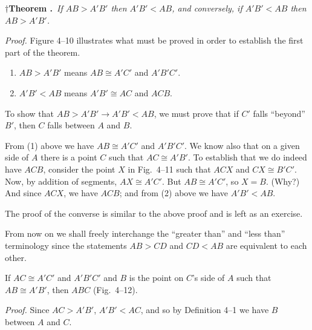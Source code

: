 \documentclass[11pt]{book}
\theoremstyle{bkplain}
\theoremstyle{XIplainnote}
\theoremstyle{bkplain}
\theoremstyle{bkplain}
\begin{document}
%
\par\medskip\noindent
\textbf{$\dagger$Theorem \thetheorem.}\ \emph{If $AB > A'B'$ then
$A'B' < AB$, and conversely, if $A'B' < AB$ then $AB > A'B'$.}%
\begingroup\let\thefootnote\relax
{}%
\endgroup
\par\medskip

\noindent\emph{Proof.} Figure 4--10 illustrates what must be proved in order to
establish the first part of the theorem.

\begin{enumerate}[label=(\arabic*), leftmargin=2.2em, itemsep=1pt, topsep=3pt]
\item $AB > A'B'$ means $AB \cong A'C'$ and $A'B'C'$.
\item $A'B' < AB$ means $A'B' \cong AC$ and $ACB$.
\end{enumerate}

\FIGIVTENELEVEN

To show that $AB > A'B' \rightarrow A'B' < AB$, we must prove that if $C'$ falls
``beyond'' $B'$, then $C$ falls between $A$ and $B$.

From (1) above we have $AB \cong A'C'$ and $A'B'C'$. We know also that on a
given side of $A$ there is a point $C$ such that $AC \cong A'B'$. To establish
that we do indeed have $ACB$, consider the point $X$ in Fig.~4--11 such that
$ACX$ and $CX \cong B'C'$. Now, by addition of segments, $AX \cong A'C'$. But
$AB \cong A'C'$, so $X = B$. (Why?) And since $ACX$, we have $ACB$; and from (2)
above we have $A'B' < AB$.

The proof of the converse is similar to the above proof and is left as an
exercise.

From now on we shall freely interchange the ``greater than'' and ``less than''
terminology since the statements $AB > CD$ and $CD < AB$ are equivalent to each
other.

\begin{theorem}
If $AC \cong A'C'$ and $A'B'C'$ and $B$ is the point on $C$'s side of $A$ such
that $AB \cong A'B'$, then $ABC$ (Fig.~4--12).
\end{theorem}

\noindent\emph{Proof.} Since $AC > A'B'$, $A'B' < AC$, and so by Definition 4--1
we have $B$ between $A$ and $C$.
\end{document}
